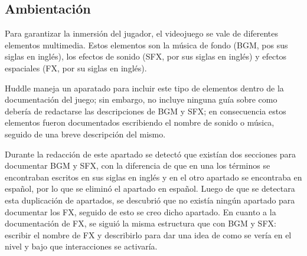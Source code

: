 \subsection{Ambientación}
	Para garantizar la inmersión del jugador, el videojuego se vale de diferentes
	 elementos multimedia. Estos elementos son la música de fondo (BGM, pos sus 
	 siglas en inglés), los efectos de sonido (SFX, por sus siglas en inglés) y  
	 efectos espaciales (FX, por su siglas en inglés).
\\
\par	
	Huddle maneja un aparatado para incluir este tipo de elementos dentro de la 
	documentación del juego; sin embargo, no incluye ninguna guía sobre como debería 
	de redactarse las descripciones de BGM y SFX; en consecuencia estos elementos 
	fueron documentados escribiendo el nombre de sonido o música, seguido de una 
	breve descripción del mismo.   
\\
\par
Durante la redacción de este apartado se detectó que existían dos secciones para 
documentar BGM y SFX, con la diferencia de que en una los términos se encontraban 
escritos en sus siglas en inglés y en el otro apartado se encontraba en español, 
por lo que se eliminó el apartado en español. Luego de que se detectara esta 
duplicación de apartados, se descubrió que no existía ningún apartado para documentar 
los FX, seguido de esto se creo dicho apartado. En cuanto a la documentación de FX, 
se siguió la misma estructura que con BGM y SFX: escribir el nombre de FX y 
describirlo para dar una idea de como se vería en el nivel y bajo que interacciones 
se activaría. 